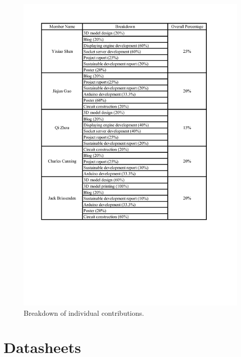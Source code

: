 \documentclass[12pt, a4paper]{report}
\begin{document}
\begin{figure}[htbp]
	\centering              %
	\includegraphics[clip, trim=1.5cm 8cm 1.5cm 1.5cm, width=\textwidth]{
		appendix/breakdown}
	\caption[Breakdown of individual contributions]{Breakdown of individual contributions.}
	\label{fig:breakdown}
\end{figure}




\chapter{Datasheets}
\end{document}
